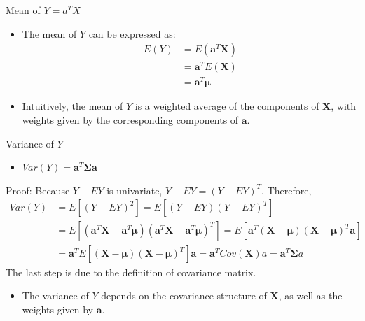 \documentclass[
  ignorenonframetext,
]{beamer}
\providecommand{\tightlist}{%
  \setlength{\itemsep}{0pt}\setlength{\parskip}{0pt}}
\begin{document}
\begin{frame}{Mean of \(Y=a^TX\)}
\protect\hypertarget{mean-of-yatx}{}
\begin{itemize}
\tightlist
\item
  The mean of \(Y\) can be expressed as: \[
  \begin{aligned}
  E(Y) &= E(\mathbf{a}^T\mathbf{X}) \\
  &= \mathbf{a}^T E(\mathbf{X}) \\
  &= \mathbf{a}^T \boldsymbol{\mu}
  \end{aligned}
  \]
\item
  Intuitively, the mean of \(Y\) is a weighted average of the components
  of \(\mathbf{X}\), with weights given by the corresponding components
  of \(\mathbf{a}\).
\end{itemize}
\end{frame}

\begin{frame}{Variance of \(Y\)}
\protect\hypertarget{variance-of-y}{}
\begin{itemize}
\tightlist
\item
  \(Var(Y)=\mathbf a^T \boldsymbol \Sigma \mathbf a\)
\end{itemize}

Proof: Because \(Y-EY\) is univariate, \(Y-EY=(Y-EY)^T\). Therefore,
\[\begin{aligned}
Var(Y)&=E[(Y-EY)^2]=E[(Y-EY)(Y-EY)^T]\\
&=E[(\mathbf a^T\mathbf X-\mathbf a^T\boldsymbol \mu )(\mathbf a^T \mathbf X-\mathbf a^T\boldsymbol \mu )^T]=E[\mathbf a^T(\mathbf X-\boldsymbol \mu)(\mathbf X -\boldsymbol \mu)^T\mathbf a]\\
&=\mathbf a^T E[(\mathbf X-\boldsymbol \mu)(\mathbf X -\boldsymbol \mu)^T]\mathbf a = \mathbf a^T Cov(\mathbf X) a= \mathbf a^T \boldsymbol \Sigma a
\end{aligned}\] The last step is due to the definition of covariance
matrix.

\begin{itemize}
\tightlist
\item
  The variance of \(Y\) depends on the covariance structure of
  \(\mathbf{X}\), as well as the weights given by \(\mathbf{a}\).
\end{itemize}
\end{frame}
\end{document}

